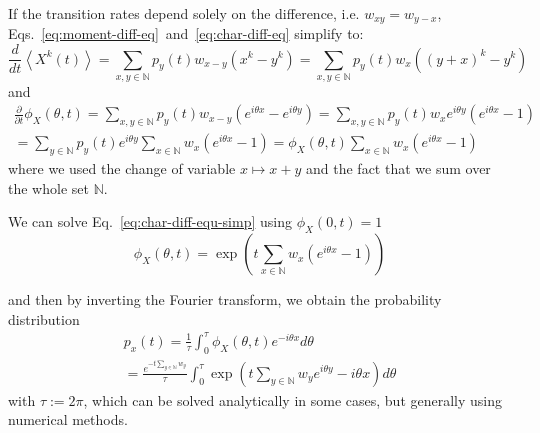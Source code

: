     If the transition rates depend solely on the difference, i.e. $w_{xy}=w_{y-x}$, Eqs.~\eqref{eq:moment-diff-eq}~and~\eqref{eq:char-diff-eq} simplify to:
    \begin{equation}
    \label{eq:moment-diff-eq-rates-diff}
        \frac{d}{dt}\left\langle X^k(t) \right\rangle
        = \sum_{x,y\in\mathbb{N}} p_y(t) w_{x-y} \left(x^k - y^k\right)
        = \sum_{x,y\in\mathbb{N}} p_y(t) w_{x} \left((y+x)^k - y^k\right)
    \end{equation}
    and 
    \begin{multline}
    \label{eq:char-diff-equ-simp}
        \frac{\partial}{\partial t}\phi_X(\theta, t) 
        = \sum_{x,y\in\mathbb{N}} p_y(t) w_{x-y} \left(e^{i\theta x} - e^{i\theta y}\right)
        = \sum_{x,y\in\mathbb{N}} p_y(t) w_{x} e^{i\theta y} \left(e^{i\theta x} - 1\right) \\
        = \sum_{y\in\mathbb{N}} p_y(t) e^{i\theta y} \sum_{x\in\mathbb{N}} w_{x} \left(e^{i\theta x} - 1\right)
        = \phi_X(\theta, t) \sum_{x\in\mathbb{N}} w_{x} \left(e^{i\theta x} - 1\right)
    \end{multline}
    where we used the change of variable $x\mapsto x+y$ and the fact that we sum over the whole set $\mathbb{N}$.
    
    We can solve Eq.~\eqref{eq:char-diff-equ-simp} using $\phi_X(0, t)=1$
    \begin{equation}
        \phi_X(\theta, t) = \exp\left(t \sum_{x\in\mathbb{N}} w_{x} \left(e^{i\theta x} - 1\right)\right)
    \end{equation}
    
    and then by inverting the Fourier transform, we obtain the probability distribution
    \begin{multline}
        p_x(t) = \frac{1}{\tau}\int_0^\tau \phi_X(\theta, t) e^{-i\theta x} d\theta \\
        = \frac{e^{-t \sum_{y\in\mathbb{N}} w_{y}}}{\tau}\int_0^\tau \exp\left(t \sum_{y\in\mathbb{N}} w_{y} e^{i\theta y} -i\theta x\right) d\theta
    \end{multline}
    with $\tau:=2\pi$, which can be solved analytically in some cases, but generally using numerical methods.
    
